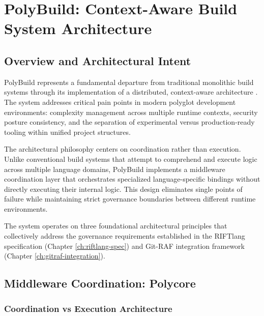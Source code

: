 \chapter{PolyBuild: Context-Aware Build System Architecture}
\label{ch:polybuild-specification}

\section{Overview and Architectural Intent}

PolyBuild represents a fundamental departure from traditional monolithic build systems through its implementation of a distributed, context-aware architecture \cite{TODO:polybuild-architecture-spec}. The system addresses critical pain points in modern polyglot development environments: complexity management across multiple runtime contexts, security posture consistency, and the separation of experimental versus production-ready tooling within unified project structures.

The architectural philosophy centers on coordination rather than execution. Unlike conventional build systems that attempt to comprehend and execute logic across multiple language domains, PolyBuild implements a middleware coordination layer that orchestrates specialized language-specific bindings without directly executing their internal logic. This design eliminates single points of failure while maintaining strict governance boundaries between different runtime environments.

The system operates on three foundational architectural principles that collectively address the governance requirements established in the RIFTlang specification (Chapter \ref{ch:riftlang-spec}) and Git-RAF integration framework (Chapter \ref{ch:gitraf-integration}).

\section{Middleware Coordination: Polycore}

\subsection{Coordination vs Execution Architecture}

